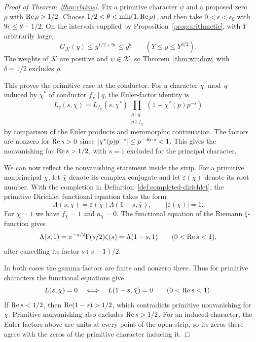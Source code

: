 \begin{proof}[Proof of Theorem~\ref{thm:claims}]
Fix a primitive character
\(\psi\) and a proposed zero \(\rho\) with \(\operatorname{Re}\rho>1/2\).
Choose \(1/2<\theta<\min(1,\operatorname{Re}\rho)\), and then take
\(0<\epsilon<\epsilon_0\) with \(9\epsilon\leq\theta-1/2\).
On the intervals supplied by Proposition~\ref{prop:arithmetic}, with \(Y\) arbitrarily large,
\[
   G_{\mathcal K}(y)\le y^{1/2+9\epsilon}\le y^\theta
            \qquad(Y\le y\le Y^{3/2}).
\]
The weights of \(\mathcal K\) are positive and \(\psi\in\mathcal K\),
so Theorem~\ref{thm:window} with \(\delta=1/2\) excludes \(\rho\).

This proves the primitive case at the conductor. For a character \(\chi\bmod q\)
induced by \(\chi^*\) of conductor \(f_\chi\mid q\), the Euler-factor
identity \cite[(25.15.4)]{dirichlet} is
\[
 L_q(s,\chi)=L_{f_\chi}(s,\chi^*)\prod_{\substack{p\mid q\\p\nmid f_\chi}}
       (1-\chi^*(p)p^{-s})
\]
by comparison of the Euler products and meromorphic continuation.
The factors are nonzero for \(\operatorname{Re} s>0\) since
\(\lvert\chi^*(p)p^{-s}\rvert\leq p^{-\operatorname{Re} s}<1\). This gives the
nonvanishing for \(\operatorname{Re} s>1/2\), with \(s=1\) excluded for the principal character.

We can now reflect the nonvanishing statement inside the strip. For a primitive
nonprincipal \(\chi\), let \(\bar\chi\) denote its
complex conjugate and let \(\varepsilon(\chi)\) denote its root number. With the completion in
Definition~\ref{def:completed-dirichlet}, the primitive Dirichlet
functional equation \cite[(25.15.5)]{dirichlet} takes the form
\[
\Lambda(s,\chi)=\varepsilon(\chi)\Lambda(1-s,\bar\chi),
                   \qquad |\varepsilon(\chi)|=1.
\]
For \(\chi=1\) we have \(f_\chi=1\) and \(a_\chi=0\). The functional
equation of the Riemann \(\xi\)-function gives
\[
 \Lambda(s,1)=\pi^{-s/2}\Gamma(s/2)\zeta(s)=\Lambda(1-s,1)
                     \qquad (0<\operatorname{Re} s<1),
\]
after cancelling its factor \(s(s-1)/2\).
\cite[(25.4.3)--(25.4.4)]{zeta}

In both cases the gamma factors are finite and nonzero there.
Thus for primitive characters the functional equations give
\[
 L(s,\chi)=0\quad\Longleftrightarrow\quad
 L(1-s,\bar\chi)=0\qquad(0<\operatorname{Re} s<1).
\]
If \(\operatorname{Re} s<1/2\), then \(\operatorname{Re}(1-s)>1/2\), which
contradicts primitive nonvanishing for \(\bar\chi\).
Primitive nonvanishing also excludes \(\operatorname{Re} s>1/2\).
For an induced character, the Euler factors above are units
at every point of the open strip, so its zeros there agree with the
zeros of the primitive character inducing it.


\end{proof}
